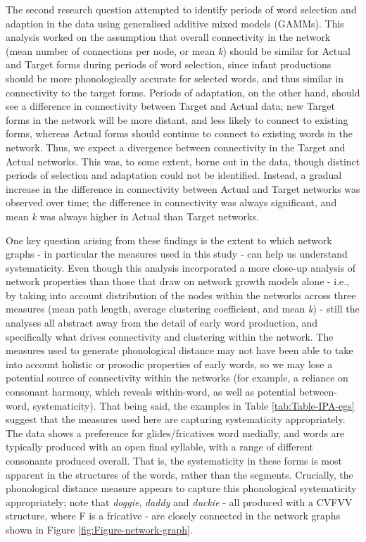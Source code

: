 \documentclass[
  man]{apa6}
\begin{document}
The second research question attempted to identify periods of word selection and adaption in the data using generalised additive mixed models (GAMMs). This analysis worked on the assumption that overall connectivity in the network (mean number of connections per node, or mean \emph{k}) should be similar for Actual and Target forms during periods of word selection, since infant productions should be more phonologically accurate for selected words, and thus similar in connectivity to the target forms. Periods of adaptation, on the other hand, should see a difference in connectivity between Target and Actual data; new Target forms in the network will be more distant, and less likely to connect to existing forms, whereas Actual forms should continue to connect to existing words in the network. Thus, we expect a divergence between connectivity in the Target and Actual networks. This was, to some extent, borne out in the data, though distinct periods of selection and adaptation could not be identified. Instead, a gradual increase in the difference in connectivity between Actual and Target networks was observed over time; the difference in connectivity was always significant, and mean \emph{k} was always higher in Actual than Target networks.

One key question arising from these findings is the extent to which network graphs - in particular the measures used in this study - can help us understand systematicity. Even though this analysis incorporated a more close-up analysis of network properties than those that draw on network growth models alone - i.e., by taking into account distribution of the nodes within the networks across three measures (mean path length, average clustering coefficient, and mean \emph{k}) - still the analyses all abstract away from the detail of early word production, and specifically what drives connectivity and clustering within the network. The measures used to generate phonological distance may not have been able to take into account holistic or prosodic properties of early words, so we may lose a potential source of connectivity within the networks (for example, a reliance on consonant harmony, which reveals within-word, as well as potential between-word, systematicity). That being said, the examples in Table \ref{tab:Table-IPA-egs} suggest that the measures used here are capturing systematicity appropriately. The data shows a preference for glides/fricatives word medially, and words are typically produced with an open final syllable, with a range of different consonants produced overall. That is, the systematicity in these forms is most apparent in the structures of the words, rather than the segments. Crucially, the phonological distance measure appears to capture this phonological systematicity appropriately; note that \emph{doggie}, \emph{daddy} and \emph{duckie} - all produced with a CVFVV structure, where F is a fricative - are closely connected in the network graphs shown in Figure \ref{fig:Figure-network-graph}.
\end{document}
